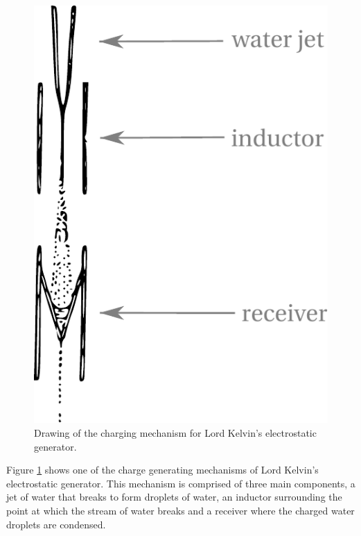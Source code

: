 \begin{figure}[H]
\begin{centering}
\includegraphics[height=0.25\textheight]{content/appendices/chargedWaterDrops/graphics/Figure_Drawing_KelvinWaterDripper_ChargingMechanism}
\par\end{centering}

\protect\caption{Drawing of the charging mechanism for Lord Kelvin's electrostatic
generator.}
\label{Figure_Drawing_KelvinWaterDripper_ChargingMechanism}
\end{figure}
Figure \ref{Figure_Drawing_KelvinWaterDripper_ChargingMechanism}
shows one of the charge generating mechanisms of Lord Kelvin's electrostatic
generator. This mechanism is comprised of three main components, a
jet of water that breaks to form droplets of water, an inductor surrounding
the point at which the stream of water breaks and a receiver where
the charged water droplets are condensed.


